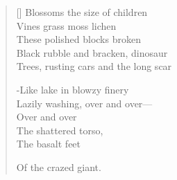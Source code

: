 \begin{verse}[\versewidth]
Blossoms the size of children\\
Vines grass moss lichen\\
These polished blocks broken\\
Black rubble and bracken, dinosaur\\
Trees, rusting cars and the long scar

-Like lake in blowzy finery\\
Lazily washing, over and over---\\
Over and over\\
The shattered torso,\\
The basalt feet

Of the crazed giant.
\end{verse}
